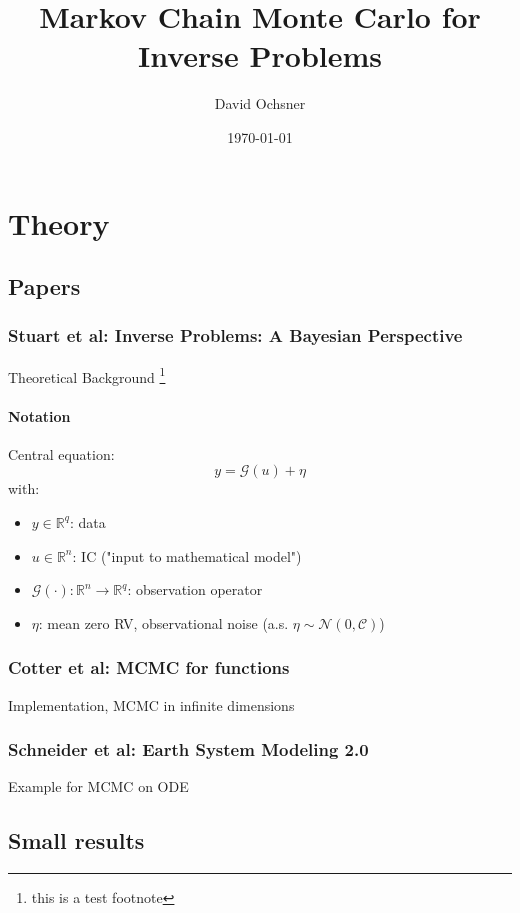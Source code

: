 \documentclass[11pt]{article}
\author{David Ochsner}
\date{\today}
\title{Markov Chain Monte Carlo for Inverse Problems}
\newcommand{\C}{{\mathcal{C}}}
\newcommand{\R}{{\mathbb{R}}}
\newcommand{\G}[1]{{\mathcal{G} \left( #1 \right)}}
\newcommand{\N}[2]{\mathcal{N}\left(#1,#2\right)}
\begin{document}
\maketitle
\tableofcontents


\section{Theory}
\label{sec:orgdb715b8}
\subsection{Papers}
\label{sec:org9d1b150}
\subsubsection{Stuart et al: Inverse Problems: A Bayesian Perspective \cite{stuart_inverse_2010}}
\label{sec:org0647d2c}
Theoretical Background \footnote{this is a test footnote}

\paragraph{Notation}
\label{sec:org2dd8ded}

Central equation:
$$y = \G{u} + \eta$$
with:
\begin{itemize}
\item \(y \in \R^q\): data
\item \(u \in \R^n\): IC ("input to mathematical model")
\item \(\G{\cdot} :\R^n \to \R^q\): observation operator
\item \(\eta\): mean zero RV, observational noise (a.s. \(\eta \sim \N{0}{\C}\))
\end{itemize}
\subsubsection{Cotter et al: MCMC for functions \cite{cotter_mcmc_2013}}
\label{sec:org6ca6c7b}
Implementation, MCMC in infinite dimensions
\subsubsection{Schneider et al: Earth System Modeling 2.0  \cite{schneider_earth_2017}}
\label{sec:org5e0d2ef}
Example for MCMC on ODE
\subsection{Small results}
\label{sec:org062c3f6}
\end{document}
